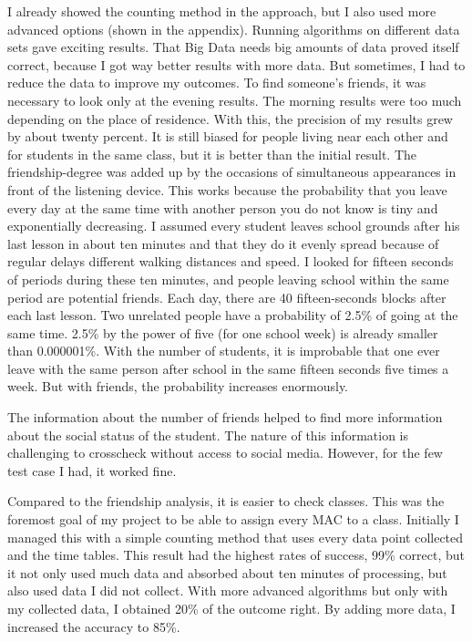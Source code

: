 \documentclass[paper=a4, fontsize=11pt]{article}
\begin{document}
I already showed the counting method in the approach, but I also used more advanced options (shown in the appendix). Running algorithms on different data sets gave exciting results. That Big Data needs big amounts of data proved itself correct, because I got way better results with more data. But sometimes, I had to reduce the data to improve my outcomes. To find someone's friends, it was necessary to look only at the evening results. The morning results were too much depending on the place of residence. With this, the precision of my results grew by about twenty percent. It is still biased for people living near each other and for students in the same class, but it is better than the initial result. The friendship-degree was added up by the occasions of simultaneous appearances in front of the listening device. This works because the probability that you leave every day at the same time with another person you do not know is tiny and exponentially decreasing. I assumed every student leaves school grounds after his last lesson in about ten minutes and that they do it evenly spread because of regular delays different walking distances and speed. I looked for fifteen seconds of periods during these ten minutes, and people leaving school within the same period are potential friends. Each day, there are 40 fifteen-seconds blocks after each last lesson. Two unrelated people have a probability of 2.5\% of going at the same time. 2.5\% by the power of five (for one school week) is already smaller than 0.000001\%. With the number of students, it is improbable that one ever leave with the same person after school in the same fifteen seconds five times a week. But with friends, the probability increases enormously.%

The information about the number of friends helped to find more information about the social status of the student. The nature of this information is challenging to crosscheck without access to social media. However, for the few test case I had, it worked fine.


Compared to the friendship analysis, it is easier to check classes. This was the foremost goal of my project to be able to assign every MAC to a class. Initially I managed this with a simple counting method that uses every data point collected and the time tables. This result had the highest rates of success, 99\% correct, but it not only used much data and absorbed about ten minutes of processing, but also used data I did not collect. With more advanced algorithms but only with my collected data, I obtained 20\% of the outcome right. By adding more data, I increased the accuracy to 85\%.
\end{document}

